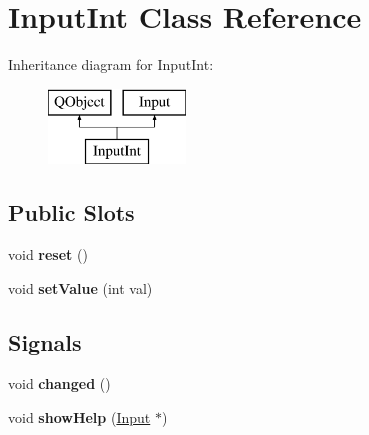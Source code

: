 \hypertarget{class_input_int}{}\section{Input\+Int Class Reference}
\label{class_input_int}
Inheritance diagram for Input\+Int\+:\begin{figure}[H]
\begin{center}
\leavevmode
\includegraphics[height=2.000000cm]{class_input_int}
\end{center}
\end{figure}
\subsection*{Public Slots}
\begin{DoxyCompactItemize}
\item 
\mbox{\label{class_input_int_aadc0ea3998b1a2999ebba00e8dd22dec}} 
void {\bfseries reset} ()
\item 
\mbox{\label{class_input_int_a4386dcb463dfa2448ff149151e28c1cf}} 
void {\bfseries set\+Value} (int val)
\end{DoxyCompactItemize}
\subsection*{Signals}
\begin{DoxyCompactItemize}
\item 
\mbox{\label{class_input_int_ae0b93d9ff0feab6c44e57f663e87761d}} 
void {\bfseries changed} ()
\item 
\mbox{\label{class_input_int_a54353b10d51efea62d61261582f49d35}} 
void {\bfseries show\+Help} (\mbox{\hyperlink{class_input}{Input}} $\ast$)
\end{DoxyCompactItemize}
